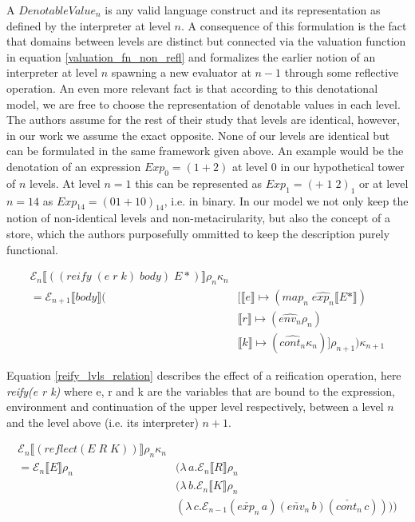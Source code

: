 \documentclass{article}
\theoremstyle{definition}
\begin{document}
A $DenotableValue_n$ is any valid language construct and its representation as defined by the interpreter at level $n$. A consequence of this formulation is the fact that domains between levels are distinct but connected via the valuation function in equation \ref{valuation_fn_non_refl} and formalizes the earlier notion of an interpreter at level $n$ spawning a new evaluator at $n-1$ through some reflective operation. An even more relevant fact is that according to this denotational model, we are free to choose the representation of denotable values in each level. The authors assume for the rest of their study that levels are identical, however, in our work we assume the exact opposite. None of our levels are identical but can be formulated in the same framework given above. An example would be the denotation of an expression $Exp_0 = (1 + 2)$ at level 0 in our hypothetical tower of $n$ levels. At level $n = 1$ this can be represented as $Exp_1 = (+\;1\;2)_1$ or at level $n = 14$ as $Exp_{14} = (01 + 10)_{14}$, i.e. in binary. In our model we not only keep the notion of non-identical levels and non-metacirularity, but also the concept of a store, which the authors purposefully ommitted to keep the description purely functional.

\begin{equation}
	\begin{split}
		\mathcal{E}_n \llbracket ((reify\;(e\;r\;k)\;body)\;E*) \rrbracket \rho_n \kappa_n \\
		= \mathcal{E}_{n+1} \llbracket body \rrbracket (& [\llbracket e \rrbracket \mapsto (map_n \; \hat{exp_{n}} \llbracket E* \rrbracket) \\
		& \llbracket r \rrbracket \mapsto (\hat{env_{n}}  \rho_n) \\
		& \llbracket k \rrbracket \mapsto (\hat{cont_{n}} \kappa_n)]\rho_{n+1}) \kappa_{n+1} \label{reify_lvls_relation}
	\end{split}
\end{equation}

Equation \ref{reify_lvls_relation} describes the effect of a reification operation, here \textit{reify(e r k)} where e, r and k are the variables that are bound to the expression, environment and continuation of the upper level respectively, between a level $n$ and the level above (i.e. its interpreter) $n+1$.

\begin{equation}
	\begin{split}
	\mathcal{E}_n \llbracket (reflect (E\;R\;K)) \rrbracket \rho_n \kappa_n \\
	= \mathcal{E}_n \llbracket E \rrbracket \rho_n & (\lambda\,a.\mathcal{E}_n \llbracket R \rrbracket \rho_n \\
										& (\lambda\,b.\mathcal{E}_n \llbracket K \rrbracket \rho_n \\
										& (\lambda\,c.\mathcal{E}_{n-1} (\check{exp_n}\,a)(\check{env_n}\,b)(\check{cont_n}\,c)))) \label{refl_lvls_relation}
	\end{split}									
\end{equation}
\end{document}
